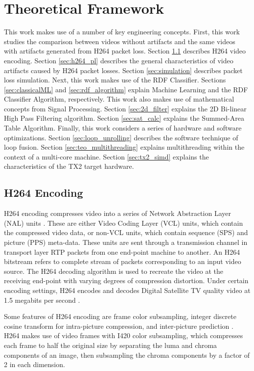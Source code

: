 \chapter{Theoretical Framework}
\label{ch:marco}

This work makes use of a number of key engineering concepts. First, this work studies the comparison between videos without artifacts and the same videos with artifacts generated from H264 packet loss. Section \ref{sec:h264} describes H264 video encoding. Section \ref{sec:h264_pl} describes the general characteristics of video artifacts caused by H264 packet losses. Section \ref{sec:simulation} describes packet loss simulation. Next, this work makes use of the RDF Classifier. Sections \ref{sec:classicalML} and \ref{sec:rdf_algorithm} explain Machine Learning and the RDF Classifier Algorithm, respectively. This work also makes use of mathematical concepts from Signal Processing. Section \ref{sec:2d_filter} explains the 2D Bi-linear High Pass Filtering algorithm. Section \ref{sec:sat_calc} explains the Summed-Area Table Algorithm. Finally, this work considers a series of hardware and software optimizations. Section \ref{sec:loop_unrolling} describes the software technique of loop fusion. Section \ref{sec:teo_multithreading} explains multithreading within the context of a multi-core machine. Section \ref{sec:tx2_simd} explains the characteristics of the TX2 target hardware.

\section{H264 Encoding}
\label{sec:h264}

H264 encoding compresses video into a series of Network Abstraction Layer (NAL) units \cite{h264}. These are either Video Coding Layer (VCL) units, which contain the compressed video data, or non-VCL units, which contain sequence (SPS) and picture (PPS) meta-data. These units are sent through a transmission channel in transport layer RTP packets \cite{Schulzrinne2003} from one end-point machine to another. An H264 bitstream refers to complete stream of packets corresponding to an input video source. The H264 decoding algorithm is used to recreate the video at the receiving end-point with varying degrees of compression distortion. Under certain encoding settings, H264 encodes and decodes Digital Satellite TV quality video at 1.5 megabits per second \cite{Jesup2011}.

Some features of H264 encoding are frame color subsampling, integer discrete cosine transform for intra-picture compression, and inter-picture prediction \cite{h264}. H264 makes use of video frames with I420 color subsampling, which compresses each frame to half the original size by separating the luma and chroma components of an image, then subsampling the chroma components by a factor of 2 in each dimension.


